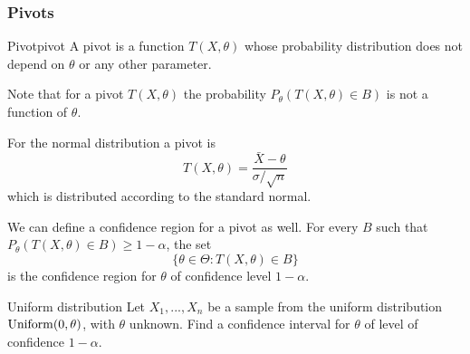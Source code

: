 \documentclass[12pt]{extarticle}
\newcommand{\Uniform}{{\operatorfont Uniform}}
\begin{document}
\subsubsection{Pivots}

\begin{definition}{Pivot}{pivot}
    A pivot is a function $T(X, \theta)$ whose probability distribution does not depend on $\theta$ or any other parameter.
\end{definition}

Note that for a pivot $T(X, \theta)$ the probability $P_\theta(T(X, \theta) \in B)$ is not a function of $\theta$.

For the normal distribution a pivot is
\begin{equation}
    T(X, \theta) = \frac{\bar X - \theta}{\sigma /\sqrt{n}}
\end{equation}
which is distributed according to the standard normal.

We can define a confidence region for a pivot as well.
For every $B$ such that $P_\theta(T(X, \theta) \in B) \geq 1- \alpha$, the set
\begin{equation}
    \{ \theta \in \Theta : T(X, \theta) \in B \}
\end{equation}
is the confidence region for $\theta$ of confidence level $1- \alpha$.

\begin{example}{Uniform distribution}{}
    Let $X_1,...,X_n$ be a sample from the uniform distribution $\Uniform(0,\theta)$, with $\theta$ unknown.
    Find a confidence interval for $\theta$ of level of confidence $1 - \alpha$.
\end{example}
\end{document}

